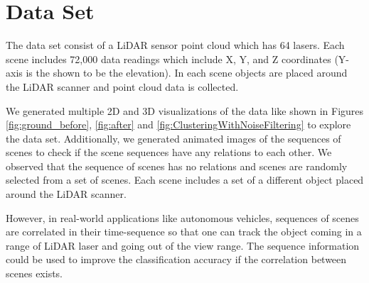\section{Data Set}
The data set consist of a LiDAR sensor point cloud which has 64 lasers. Each scene includes 72,000 data readings 
which include X, Y, and Z coordinates (Y-axis is the shown to be the elevation).
In each scene objects are placed around the LiDAR scanner and point cloud data is collected. 
 

We generated multiple 2D and 3D visualizations of the data like shown in Figures \ref{fig:ground_before},  \ref{fig:after} 
and \ref{fig:ClusteringWithNoiseFiltering} to explore the data set.
Additionally, we generated animated images of the sequences of scenes to check if the scene sequences have any relations to each other.
We observed that the sequence of scenes has no relations and scenes are randomly selected from a set of scenes. Each scene 
includes a set of a different object placed around the LiDAR scanner.  

However, in real-world applications like autonomous vehicles, sequences of scenes are correlated in their time-sequence so that 
one can track the object coming in a range of LiDAR laser and going out of the view range.
The sequence information could be used to improve the classification accuracy if the correlation between scenes exists.



%


